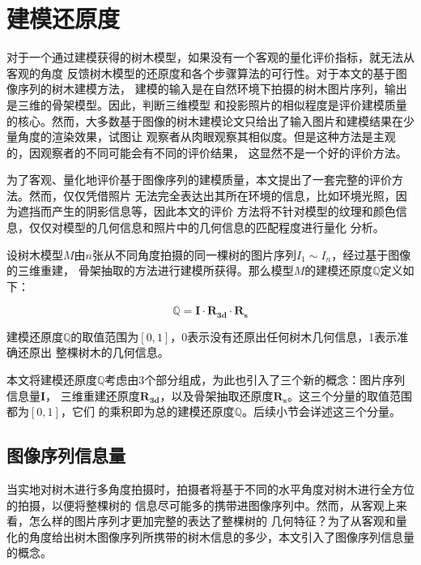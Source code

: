 \section{建模还原度}
\label{sec:qualityevaluation}
对于一个通过建模获得的树木模型，如果没有一个客观的量化评价指标，就无法从客观的角度
反馈树木模型的还原度和各个步骤算法的可行性。对于本文的基于图像序列的树木建模方法，
建模的输入是在自然环境下拍摄的树木图片序列，输出是三维的骨架模型。因此，判断三维模型
和投影照片的相似程度是评价建模质量的核心。然而，大多数基于图像的树木建模论文\cite{quanlong,
tanping,lichuan,tanping2,liu}只给出了输入图片和建模结果在少量角度的渲染效果，试图让
观察者从肉眼观察其相似度。但是这种方法是主观的，因观察者的不同可能会有不同的评价结果，
这显然不是一个好的评价方法。

为了客观、量化地评价基于图像序列的建模质量，本文提出了一套完整的评价方法。然而，仅仅凭借照片
无法完全表达出其所在环境的信息，比如环境光照，因为遮挡而产生的阴影信息等，因此本文的评价
方法将不针对模型的纹理和颜色信息，仅仅对模型的几何信息和照片中的几何信息的匹配程度进行量化
分析。

设树木模型$M$由$n$张从不同角度拍摄的同一棵树的图片序列$I_1\sim I_n$，经过基于图像的三维重建，
骨架抽取的方法进行建模所获得。那么模型$M$的建模还原度$\mathbb{Q}$定义如下：\\
\begin{definition}
	\[\mathbb{Q}=\mathbf{I}\cdot\mathbf{R_{3d}}\cdot\mathbf{R_s}\]
\end{definition}

建模还原度$\mathbb{Q}$的取值范围为$[0,1]$，0表示没有还原出任何树木几何信息，1表示准确还原出
整棵树木的几何信息。

本文将建模还原度$\mathbb{Q}$考虑由3个部分组成，为此也引入了三个新的概念：图片序列信息量$\mathbf{I}$，
三维重建还原度$\mathbf{R_{3d}}$，以及骨架抽取还原度$\mathbf{R_s}$。这三个分量的取值范围都为$[0,1]$，它们
的乘积即为总的建模还原度$\mathbb{Q}$。后续小节会详述这三个分量。

\subsection{图像序列信息量}
当实地对树木进行多角度拍摄时，拍摄者将基于不同的水平角度对树木进行全方位的拍摄，以便将整棵树的
信息尽可能多的携带进图像序列中。然而，从客观上来看，怎么样的图片序列才更加完整的表达了整棵树的
几何特征？为了从客观和量化的角度给出树木图像序列所携带的树木信息的多少，本文引入了图像序列信息量的概念。

